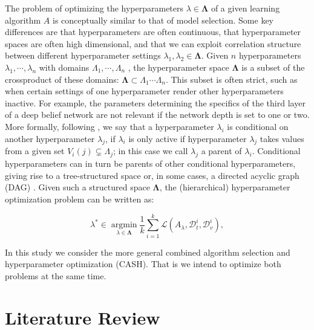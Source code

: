 \documentclass{article}
\begin{document}
The problem of optimizing the hyperparameters $\lambda \in \mathbf{\Lambda}$ of a given learning algorithm $A$ is conceptually similar to that of model selection. Some key differences are that hyperparameters are often continuous, that hyperparameter spaces are often high dimensional, and that we can exploit correlation structure between different hyperparameter settings $\lambda_1,\lambda_2 \in \mathbf{\Lambda} $. Given $n$ hyperparameters $\lambda_1, \cdots, \lambda_n$ with domains $\Lambda_1, \cdots, \Lambda_n$ , the hyperparameter space $\mathbf{\Lambda} $ is a subset of the crossproduct of these domains: $\mathbf{\Lambda} \subset \Lambda_1 \cdots \Lambda_n$. This subset is often strict, such as when certain settings of one hyperparameter render other hyperparameters inactive. For example, the parameters determining the specifics of the third layer of a deep belief network are not relevant if the network depth is set to one or two. More formally, following \cite{Hutter2009}, we say that a hyperparameter $\lambda_i$ is conditional on another hyperparameter $\lambda_j$, if $\lambda_i$ is only active if hyperparameter $\lambda_j$ takes values from a given set $V_i \left(j \right) \subsetneq \Lambda_j$; in this case we call $\lambda_j$ a parent of $\lambda_i$. Conditional hyperparameters can in turn be parents of other conditional hyperparameters, giving rise to a tree-structured space \cite{Bergstra2011} or, in some cases, a directed acyclic graph (DAG) \cite{Hutter2009}. Given such a structured space $\mathbf{\Lambda}$, the (hierarchical) hyperparameter optimization problem can be written as:

\begin{equation}
\lambda^* \in \underset{\lambda \in \mathbf{\Lambda}}{\operatorname{argmin}} \frac{1}{k} \sum_{i=1}^{k} \mathcal{L} \left( A_{\lambda}, \mathcal{D}^{i}_{t},  \mathcal{D}^{i}_{v} \right),
\end{equation}

In this study we consider the more general combined algorithm selection and hyperparameter optimization (CASH). That is we intend to optimize both problems at the same time.


\section{Literature Review}
\label{sec:literature_review}
\end{document}
